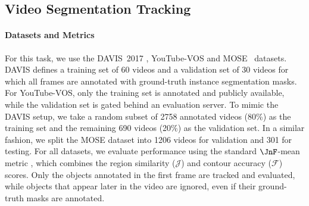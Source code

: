 \subsection{Video Segmentation Tracking}
\label{app:exp-details:tracking}

\paragraph{Datasets and Metrics}
For this task, we use the DAVIS~2017 \citep{pont20172017}, YouTube-VOS \citep{xu2018youtubevos} and MOSE~\citep{ding2023mose} datasets.
DAVIS defines a training set of 60 videos and a validation set of 30 videos for which all frames are annotated with ground-truth instance segmentation masks.
For YouTube-VOS, only the training set is annotated and publicly available, while the validation set is gated behind an evaluation server.
To mimic the DAVIS setup, we take a random subset of 2758 annotated videos (80\%) as the training set and the remaining 690 videos (20\%) as the validation set.
In a similar fashion, we split the MOSE dataset into 1206 videos for validation and 301 for testing.
For all datasets, we evaluate performance using the standard \(\JnF\)-mean metric \citep{perazzi2016benchmark}, which combines the region similarity (\(\mathcal{J}\)) and contour accuracy (\(\mathcal{F}\)) scores.
Only the objects annotated in the first frame are tracked and evaluated, while objects that appear later in the video are ignored, even if their ground-truth masks are annotated.

